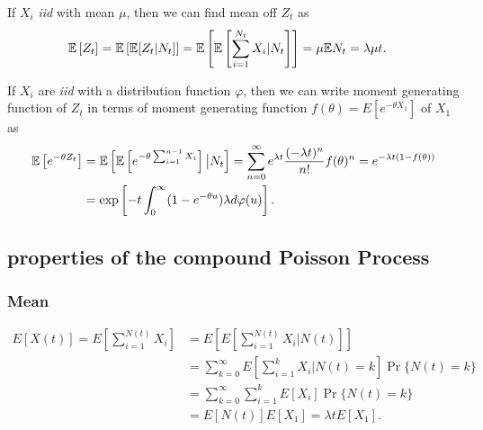 \documentclass[a4paper,english,10pt]{article}
\begin{document}
\begin{exmp} If $X_i$ \emph{iid} with mean $\mu$, then we can find mean off $Z_t$ as
\begin{align*}
 \mathbb{E}\left[Z_t\right] = \mathbb{E}\left[\mathbb{E}[Z_t|N_t]\right]&=\mathbb{E}\left[\mathbb{E}\left[\sum_{i=1}^{N_t}X_i|N_t\right]\right] = \mu\mathbb{E} N_t = \lambda \mu t.
\end{align*}
\end{exmp}

\begin{exmp}  If $X_i$ are \emph{iid} with a distribution function $\varphi$, then we can write moment generating function of $Z_t$ in terms of moment generating function $f(\theta) = E[e^{-\theta X_1}]$ of $X_1$ as
\begin{align*}
\mathbb{E}\left[e^{-\theta Z_t}\right] &= \mathbb{E}\left[\mathbb{E}\left[e^{-\theta\sum_{i=1}^{n-1}X_i}\right]\big|N_t\right] 
= \sum_{n=0}^{\infty}e^{\lambda t}\frac{(-\lambda t)^n}{n!}f(\theta)^n
= e^{-\lambda t (1-f(\theta))}\\
&= \exp\left[-t\int_{0}^{\infty}(1-e^{-\theta u})\lambda d\varphi(u)\right].
\end{align*}
\end{exmp}

\subsection{properties of the compound Poisson Process}
\subsubsection{Mean}
\begin{align*}
	E[X(t)] = E[\sum_{i=1}^{N(t)} X_i] &= E[E[\sum_{i=1}^{N(t)} X_i|N(t)]] \\
	&= \sum_{k=0}^\infty E\left[\sum_{i=1}^{k} X_i|N(t)=k\right]\Pr\{N(t) = k\}\\
	&= \sum_{k=0}^\infty \sum_{i=1}^{k} E[X_i]\Pr\{N(t) = k\}\\
	&= E[N(t)]E[X_1] = \lambda tE[X_1].
\end{align*}
\end{document}
